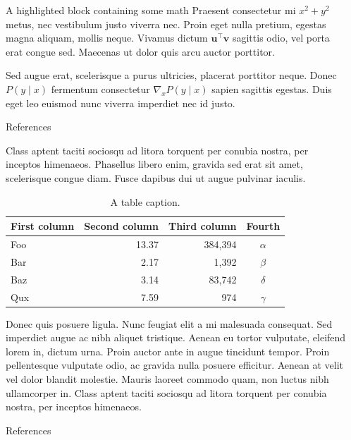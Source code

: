 \documentclass[final]{beamer}
\newlength{\sepwidth}
\newlength{\colwidth}
\newcommand{\separatorcolumn}{\begin{column}{\sepwidth}\end{column}}
\begin{document}
\begin{frame}[t]
\begin{columns}[t]
\begin{column}{\colwidth}
\begin{exampleblock}{A highlighted block containing some math}
    Praesent consectetur mi $x^2 + y^2$ metus, nec vestibulum justo viverra
    nec. Proin eget nulla pretium, egestas magna aliquam, mollis neque. Vivamus
    dictum $\mathbf{u}^\intercal\mathbf{v}$ sagittis odio, vel porta erat
    congue sed. Maecenas ut dolor quis arcu auctor porttitor.


    Sed augue erat, scelerisque a purus ultricies, placerat porttitor neque.
    Donec $P(y \mid x)$ fermentum consectetur $\nabla_x P(y \mid x)$ sapien
    sagittis egestas. Duis eget leo euismod nunc viverra imperdiet nec id
    justo.

  \end{exampleblock}

  \begin{block}{References}

    Class aptent taciti sociosqu ad litora torquent per conubia nostra, per
    inceptos himenaeos. Phasellus libero enim, gravida sed erat sit amet,
    scelerisque congue diam. Fusce dapibus dui ut augue pulvinar iaculis.

    \begin{table}
      \centering
      \begin{tabular}{l r r c}
        \toprule
        \textbf{First column} & \textbf{Second column} & \textbf{Third column} & \textbf{Fourth} \\
        \midrule
        Foo & 13.37 & 384,394 & $\alpha$ \\
        Bar & 2.17 & 1,392 & $\beta$ \\
        Baz & 3.14 & 83,742 & $\delta$ \\
        Qux & 7.59 & 974 & $\gamma$ \\
        \bottomrule
      \end{tabular}
      \caption{A table caption.}
    \end{table}

    Donec quis posuere ligula. Nunc feugiat elit a mi malesuada consequat. Sed
    imperdiet augue ac nibh aliquet tristique. Aenean eu tortor vulputate,
    eleifend lorem in, dictum urna. Proin auctor ante in augue tincidunt
    tempor. Proin pellentesque vulputate odio, ac gravida nulla posuere
    efficitur. Aenean at velit vel dolor blandit molestie. Mauris laoreet
    commodo quam, non luctus nibh ullamcorper in. Class aptent taciti sociosqu
    ad litora torquent per conubia nostra, per inceptos himenaeos.



  \end{block}

  \begin{block}{References}

    \nocite{*}
    \footnotesize{}

  \end{block}

\end{column}

\separatorcolumn
\end{columns}
\end{frame}
\end{document}
